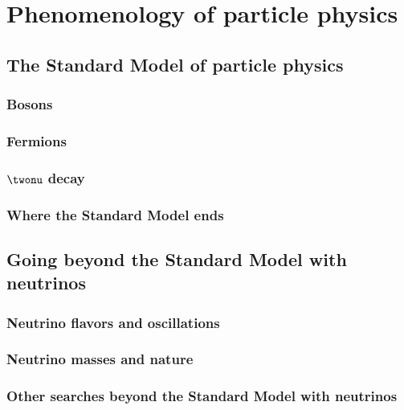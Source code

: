 \chapter{Phenomenology of particle physics}
\section{The Standard Model of particle physics}
\subsection{Bosons}
\subsection{Fermions}
\subsection{$\twonu$ decay}
\subsection{Where the Standard Model ends}
\section{Going beyond the Standard Model with neutrinos}
\subsection{Neutrino flavors and oscillations}
\subsection{Neutrino masses and nature}
\label{subsec:nu_mass_nature}
\subsection{Other searches beyond the Standard Model with neutrinos}
